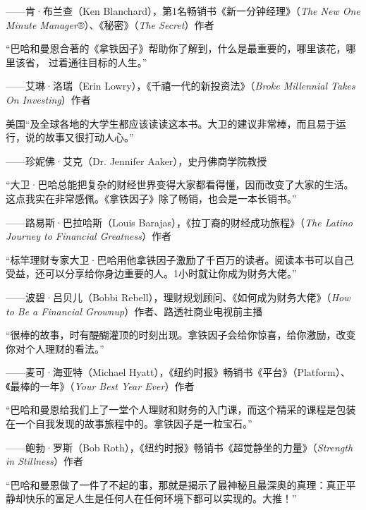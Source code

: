 {\kaishu \hfill ——肯·布兰查（Ken Blanchard），第1名畅销书《新一分钟经理》（\textit{The New One Minute Manager}®）、《秘密》（\textit{The Secret}）作者}\vspace{1em}

“巴哈和曼恩合著的《拿铁因子》帮助你了解到，什么是最重要的，哪里该花，哪里该省， 过着通往目标的人生。”

{\kaishu \hfill ——艾琳·洛瑞（Erin Lowry），《千禧一代的新投资法》（\textit{Broke Millennial Takes On Investing}）作者}\vspace{1em}

美国“及全球各地的大学生都应该读读这本书。大卫的建议非常棒，而且易于运行，说的故事又很打动人心。”

{\kaishu \hfill ——珍妮佛·艾克（Dr. Jennifer Aaker），史丹佛商学院教授}\vspace{1em}

“大卫·巴哈总能把复杂的财经世界变得大家都看得懂，因而改变了大家的生活。这点我实在非常感佩。《拿铁因子》除了畅销，也会是一本长销书。”

{\kaishu \hfill ——路易斯·巴拉哈斯（Louis Barajas），《拉丁裔的财经成功旅程》（\textit{The Latino Journey to Financial Greatness}）作者}\vspace{1em}

“标竿理财专家大卫·巴哈用他拿铁因子激励了千百万的读者。阅读本书可以自己受益，还可以分享给你身边重要的人。1小时就让你成为财务大佬。”

{\kaishu \hfill ——波碧·吕贝儿（Bobbi Rebell），理财规划顾问、《如何成为财务大佬》（\textit{How to Be a Financial Grownup}）作者、路透社商业电视前主播}\vspace{1em}

“很棒的故事，时有醍醐灌顶的时刻出现。拿铁因子会给你惊喜，给你激励，改变你对个人理财的看法。”

{\kaishu \hfill ——麦可·海亚特（Michael Hyatt），《纽约时报》畅销书《平台》（Platform）、《最棒的一年》（\textit{Your Best Year Ever}）作者}\vspace{1em}

“巴哈和曼恩给我们上了一堂个人理财和财务的入门课，而这个精采的课程是包装在一个自我发现的故事旅程中的。拿铁因子是一粒宝石。”

{\kaishu \hfill ——鲍勃·罗斯（Bob Roth），《纽约时报》畅销书《超觉静坐的力量》（\textit{Strength in Stillness}）作者}\vspace{1em}

“巴哈和曼恩做了一件了不起的事，那就是揭示了最神秘且最深奥的真理：真正平静却快乐的富足人生是任何人在任何环境下都可以实现的。大推！”

